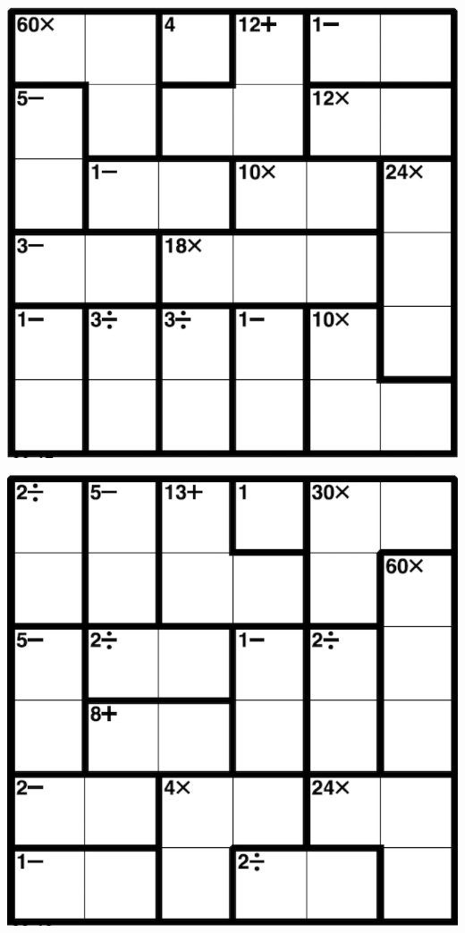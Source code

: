 
\includegraphics[scale=1]{Gambar/Lampiran/6x6_31.png}

\includegraphics[scale=1]{Gambar/Lampiran/6x6_32.png}
